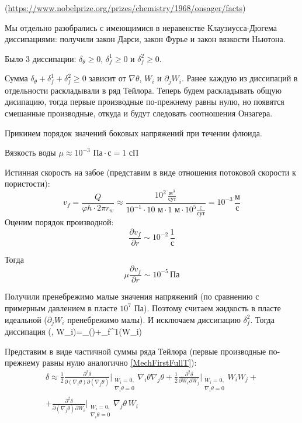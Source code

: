 \documentclass[main.tex]{subfiles}
\begin{document}
(\url{https://www.nobelprize.org/prizes/chemistry/1968/onsager/facts})

Мы отдельно разобрались с имеющимися в неравенстве Клаузиусса-Дюгема диссипациями: получили закон Дарси, закон Фурье и закон вязкости Ньютона.

Было 3 диссипации: $\delta_\theta\geqslant 0$, $\delta_f^1\geqslant 0$ и $\delta_f^2\geqslant 0$.

Сумма $\delta_\theta+\delta_f^1+\delta_f^2\geqslant 0$ зависит от $\nabla\theta$, $W_i$ и $\partial_jW_i$.
Ранее каждую из диссипаций в отдельности раскладывали в ряд Тейлора. Теперь будем раскладывать общую дисипацию, тогда первые производные по-прежнему равны нулю, но появятся смешанные производные, откуда и будут следовать соотношения Онзагера.

Прикинем порядок значений боковых напряжений при течении флюида.

Вязкость воды $\mu\approx10^{-3}\text{ Па}\cdot\text{с}=1\text{ сП}$

Истинная скорость на забое (представим в виде отношения потоковой скорости к пористости):
$$v_f=\frac{Q}{\varphi h\cdot 2\pi r_w}\approx\frac{10^2\,\frac{\text{м}^3}{\text{сут}}}{10^{-1}\cdot 10\text{ м}\cdot 1\text{ м}\cdot 10^5\frac{\text{с}}{\text{сут}}}=10^{-3}\,\frac{\text{м}}{\text{с}}$$
Оценим порядок производной:
$$\frac{\partial v_f}{\partial r}\sim 10^{-2}\,\frac{1}{\text{с}}$$

Тогда
$$\mu\frac{\partial v_f}{\partial r}\sim 10^{-5}\,\text{Па}$$

Получили пренебрежимо малые значения напряжений (по сравнению с примерным давлением в пласте $10^7$ Па). Поэтому считаем жидкость в пласте идеальной ($\partial_jW_i$ пренебрежимо малы). И исключаем диссипацию $\delta_f^2$. Тогда диссипация
\beq
\delta(\nabla\theta, W_i)=\delta_\theta(\nabla\theta)+\delta_f^1(W_i) 
\eeq

Представим в виде частичной суммы ряда Тейлора (первые производные по-прежнему равны нулю аналогично \eqref{MechFirstFullT}):
\begin{multline}\label{NewBothDis1}
\delta\approx\frac{1}{2}\frac{\partial^2\delta}{\partial\left(\nabla_i\theta\right)\partial\left(\nabla_j\theta\right)}\bigg|_{\substack{W_{\!i}=0,\\\nabla_{\!i}\theta=0}}\nabla_i\theta\nabla_j\theta+\frac{1}{2}\frac{\partial^2\delta}{\partial W_i\partial W_j}\bigg|_{\substack{W_{\!i}=0,\\\nabla_{\!i}\theta=0}}W_iW_j+\\+\frac{\partial^2\delta}{\partial\left(\nabla_j\theta\right)\partial W_i}\bigg|_{\substack{W_{\!i}=0,\\\nabla_{\!i}\theta=0}}\nabla_j\theta\,W_i
\end{multline}
\end{document}
